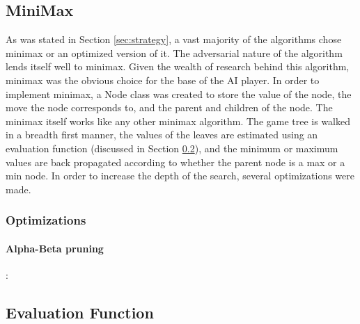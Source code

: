 \documentclass[]{article}
\begin{document}
\subsection{MiniMax}
As was stated in Section \ref{sec:strategy}, a vast majority of the algorithms chose minimax or an optimized version of it. The adversarial nature of the algorithm lends itself well to minimax. Given the wealth of research behind this algorithm, minimax was the obvious choice for the base of the AI player. In order to implement minimax, a Node class was created to store the value of the node, the move the node corresponds to, and the parent and children of the node. %
The minimax itself works like any other minimax algorithm. The game tree is walked in a breadth first manner, the values of the leaves are estimated using an evaluation function (discussed in Section \ref{sec:evalFn}), and the minimum or maximum values are back propagated according to whether the parent node is a max or a min node. In order to increase the depth of the search, several optimizations were made.

\subsubsection{Optimizations}
\paragraph{Alpha-Beta pruning}:



\subsection{Evaluation Function}
\label{sec:evalFn}

\end{document}
